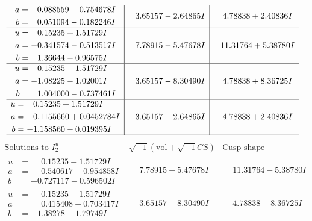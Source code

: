 \documentclass[1p]{elsarticle_modified}
\theoremstyle{definition}
\newcommand{\I}{\sqrt{-1}}
\begin{document}
$$\begin{array}{c|c|c}
\begin{aligned}
a &= \phantom{-}0.088559 - 0.754678 I \\
b &= \phantom{-}0.051094 - 0.182246 I\end{aligned}
 & \phantom{-}3.65157 - 2.64865 I & \phantom{-}4.78838 + 2.40836 I \\ \hline\begin{aligned}
u &= \phantom{-}0.15235 + 1.51729 I \\
a &= -0.341574 - 0.513517 I \\
b &= \phantom{-}1.36644 - 0.96575 I\end{aligned}
 & \phantom{-}7.78915 - 5.47678 I & \phantom{-}11.31764 + 5.38780 I \\ \hline\begin{aligned}
u &= \phantom{-}0.15235 + 1.51729 I \\
a &= -1.08225 - 1.02001 I \\
b &= \phantom{-}1.004000 - 0.737461 I\end{aligned}
 & \phantom{-}3.65157 - 8.30490 I & \phantom{-}4.78838 + 8.36725 I \\ \hline\begin{aligned}
u &= \phantom{-}0.15235 + 1.51729 I \\
a &= \phantom{-}0.1155660 + 0.0452784 I \\
b &= -1.158560 - 0.019395 I\end{aligned}
 & \phantom{-}3.65157 - 2.64865 I & \phantom{-}4.78838 + 2.40836 I\\
 \hline 
 \end{array}$$\newpage$$\begin{array}{c|c|c}  
\text{Solutions to }I^u_{2}& \I (\text{vol} + \sqrt{-1}CS) & \text{Cusp shape}\\
 \hline 
\begin{aligned}
u &= \phantom{-}0.15235 - 1.51729 I \\
a &= \phantom{-}0.540617 - 0.954858 I \\
b &= -0.727117 - 0.596502 I\end{aligned}
 & \phantom{-}7.78915 + 5.47678 I & \phantom{-}11.31764 - 5.38780 I \\ \hline\begin{aligned}
u &= \phantom{-}0.15235 - 1.51729 I \\
a &= \phantom{-}0.415408 - 0.703417 I \\
b &= -1.38278 - 1.79749 I\end{aligned}
 & \phantom{-}3.65157 + 8.30490 I & \phantom{-}4.78838 - 8.36725 I \\ \hline\begin{aligned}

\end{aligned}
\end{array}$$
\end{document}

